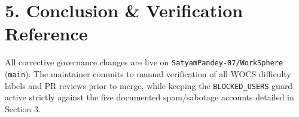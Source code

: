 \documentclass[11pt,a4paper]{article}
\begin{document}
\section{5. Conclusion \& Verification Reference}
All corrective governance changes are live on \texttt{SatyamPandey-07/WorkSphere} (\texttt{main}). The maintainer commits to manual verification of all WOCS difficulty labels and PR reviews prior to merge, while keeping the \texttt{BLOCKED\_USERS} guard active strictly against the five documented spam/sabotage accounts detailed in Section 3.
\end{document}
